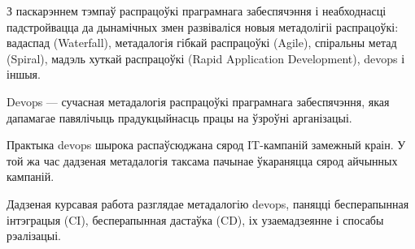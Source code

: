 \sectionWithoutNumber{\prefacename}
З паскарэннем тэмпаў распрацоўкі праграмнага забеспячэння і
неабходнасці падстройвацца да дынамічных змен
развіваліся новыя метадолігіі распрацоўкі: вадаспад (Waterfall),
метадалогія гібкай распрацоўкі (Agile), спіральны метад (Spiral),
мадэль хуткай распрацоўкі (Rapid Application Development), devops і іншыя.


Devops — сучасная метадалогія распрацоўкі праграмнага забеспячэння, якая
дапамагае павялічыць прадукцыйнасць працы на ўзроўні арганізацыі.

Практыка devops шырока распаўсюджана сярод IT-кампаній замежный краін.
У той жа час дадзеная метадалогія таксама пачынае ўкараняцца сярод айчынных
кампаній.

Дадзеная курсавая работа разглядае метадалогію devops, паняцці
бесперапынная інтэграцыя (CI), бесперапынная дастаўка (CD),
іх узаемадзеянне і спосабы рэалізацыі.

\clearpage

